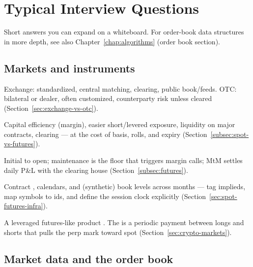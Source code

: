\section{Typical Interview Questions}
\label{sec:quant-interview-qa}
Short answers you can expand on a whiteboard. For order-book data structures in more depth, 
see also Chapter~\ref{chap:algorithms} (order book section).

\subsection{Markets and instruments}
Exchange: standardized, central matching, clearing, public book/feeds. 
OTC: bilateral or dealer, often customized, counterparty risk unless cleared 
(Section~\ref{sec:exchange-vs-otc}).

Capital efficiency (margin), easier short/levered exposure, liquidity on major 
contracts, clearing --- at the cost of basis, rolls, and expiry 
(Section~\ref{subsec:spot-vs-futures}).

Initial to open; maintenance is the floor that triggers margin calls; MtM settles 
daily P\&L with the clearing house (Section~\ref{subsec:futures}).

Contract ,  calendars, and 
 (synthetic) book levels across months --- tag implieds, map 
symbols to ids, and define the session clock explicitly 
(Section~\ref{sec:spot-futures-infra}).

A leveraged futures-like product . The 
 is a periodic payment between longs and shorts that 
pulls the perp mark toward spot (Section~\ref{sec:crypto-markets}).

\subsection{Market data and the order book}

